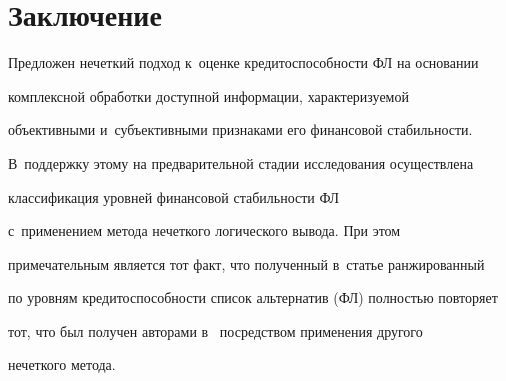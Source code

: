 \section{Заключение}



  Предложен нечеткий подход к~оценке кредитоспособности ФЛ на основании 

комплексной обработки доступной информации, характеризуемой 

объективными и~субъективными признаками его финансовой стабильности. 

В~поддержку этому на предварительной стадии исследования осуществлена 

классификация уровней финансовой стабильности ФЛ

с~применением метода нечеткого логического вывода. При этом 

примечательным является тот факт, что полученный в~статье ранжированный 

по уровням кредитоспособности список альтернатив (ФЛ) полностью повторяет 

тот, что был получен авторами в~\cite{4-rz} посредством применения другого 

нечеткого метода. 



